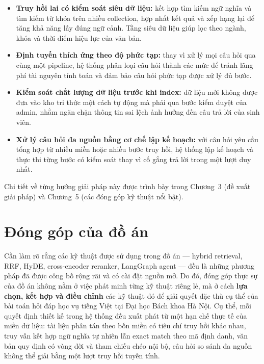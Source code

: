 \documentclass[../DoAn.tex]{subfiles}
\begin{document}
\begin{itemize}
    \item \textbf{Truy hồi lai có kiểm soát siêu dữ liệu:} kết hợp tìm kiếm
    ngữ nghĩa và tìm kiếm từ khóa trên nhiều collection, hợp nhất kết quả và
    xếp hạng lại để tăng khả năng lấy đúng ngữ cảnh. Tầng siêu dữ liệu giúp
    lọc theo ngành, khóa và thời điểm hiệu lực của văn bản.

    \item \textbf{Định tuyến thích ứng theo độ phức tạp:} thay vì xử lý mọi
    câu hỏi qua cùng một pipeline, hệ thống phân loại câu hỏi thành các mức
    để tránh lãng phí tài nguyên tính toán và đảm bảo câu hỏi phức tạp được
    xử lý đủ bước.

    \item \textbf{Kiểm soát chất lượng dữ liệu trước khi index:} dữ liệu mới
    không được đưa vào kho tri thức một cách tự động mà phải qua bước kiểm
    duyệt của admin, nhằm ngăn chặn thông tin sai lệch ảnh hưởng đến câu trả
    lời của sinh viên.

    \item \textbf{Xử lý câu hỏi đa nguồn bằng cơ chế lập kế hoạch:} với câu
    hỏi yêu cầu tổng hợp từ nhiều miền hoặc nhiều bước truy hồi, hệ thống lập
    kế hoạch và thực thi từng bước có kiểm soát thay vì cố gắng trả lời trong
    một lượt duy nhất.
\end{itemize}

Chi tiết về từng hướng giải pháp này được trình bày trong Chương~3 (đề xuất
giải pháp) và Chương~5 (các đóng góp kỹ thuật nổi bật).

\section{Đóng góp của đồ án}
\label{sec:donggop}

Cần làm rõ rằng các kỹ thuật được sử dụng trong đồ án --- hybrid retrieval, RRF,
HyDE, cross-encoder reranker, LangGraph agent --- đều là những phương pháp đã
được công bố rộng rãi và có cài đặt nguồn mở. Do đó, đóng góp thực sự của đồ
án không nằm ở việc phát minh từng kỹ thuật riêng lẻ, mà ở cách \textbf{lựa
chọn, kết hợp và điều chỉnh} các kỹ thuật đó để giải quyết đặc thù cụ thể của
bài toán hỏi đáp học vụ tiếng Việt tại Đại học Bách khoa Hà Nội. Cụ thể, mỗi
quyết định thiết kế trong hệ thống đều xuất phát từ một hạn chế thực tế của
miền dữ liệu: tài liệu phân tán theo bốn miền có tiêu chí truy hồi khác nhau,
truy vấn kết hợp ngữ nghĩa tự nhiên lẫn exact match theo mã định danh, văn bản
quy định có vòng đời và tham chiếu chéo nội bộ, câu hỏi so sánh đa nguồn không
thể giải bằng một lượt truy hồi tuyến tính.
\end{document}
